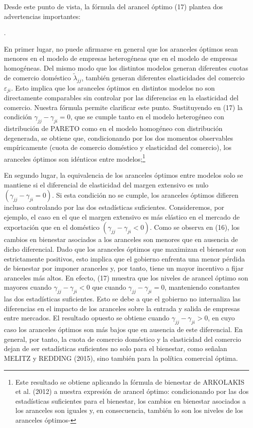 \documentclass[10pt,a4paper]{article}
\newcounter{numitem}
\newenvironment{lnum}
      {\begin{list}{\arabic{numitem}.}{%
          \usecounter{numitem}%
          \setlength{\leftmargin}{1cm}%
          \setlength{\parskip}{3pt}%
          \setlength{\itemsep}{0pt}%
          \setlength{\parsep}{0pt}%
      }}
      {\end{list}}
\begin{document}
Desde este punto de vista, la fórmula del arancel óptimo (17) plantea dos advertencias importantes:
\begin{lnum}
    \item En primer lugar, no puede afirmarse en general que los aranceles óptimos sean menores en el modelo de empresas heterogéneas que en el modelo de empresas homogéneas. Del mismo modo que los distintos modelos generan diferentes cuotas de comercio doméstico $\tilde{\lambda}_{jj}$, también generan diferentes elasticidades del comercio $\varepsilon_{ji}$. Esto implica que los aranceles óptimos en distintos modelos no son directamente comparables sin controlar por las diferencias en la elasticidad del comercio. Nuestra fórmula permite clarificar este punto. Sustituyendo en (17) la condición $\gamma_{jj} - \gamma_{ji} = 0$, que se cumple tanto en el modelo heterogéneo con distribución de PARETO como en el modelo homogéneo con distribución degenerada, se obtiene que, condicionando por los dos momentos observables empíricamente (cuota de comercio doméstico y elasticidad del comercio), los aranceles óptimos son idénticos entre modelos;\footnote{%
        Este resultado se obtiene aplicando la fórmula de bienestar de ARKOLAKIS et al. (2012) a nuestra expresión de arancel óptimo: condicionando por las dos estadísticas suficientes para el bienestar, los cambios en bienestar asociados a los aranceles son iguales y, en consecuencia, también lo son los niveles de los aranceles óptimos-
    }
    \item En segundo lugar, la equivalencia de los aranceles óptimos entre modelos solo se mantiene si el diferencial de elasticidad del margen extensivo es nulo $(\gamma_{jj} - \gamma_{ji} = 0)$. Si esta condición no se cumple, los aranceles óptimos difieren incluso controlando por las dos estadísticas suficientes. Consideremos, por ejemplo, el caso en el que el margen extensivo es más elástico en el mercado de exportación que en el doméstico $(\gamma_{jj} - \gamma_{ji} < 0)$. Como se observa en (16), los cambios en bienestar asociados a los aranceles son menores que en ausencia de dicho diferencial. Dado que los aranceles óptimos que maximizan el bienestar son estrictamente positivos, esto implica que el gobierno enfrenta una menor pérdida de bienestar por imponer aranceles y, por tanto, tiene un mayor incentivo a fijar aranceles más altos. En efecto, (17) muestra que los niveles de arancel óptimo son mayores cuando $\gamma_{jj} - \gamma_{ji} < 0$ que cuando $\gamma_{jj} - \gamma_{ji} = 0$, manteniendo constantes las dos estadísticas suficientes. Esto se debe a que el gobierno no internaliza las diferencias en el impacto de los aranceles sobre la entrada y salida de empresas entre mercados. El resultado opuesto se obtiene cuando $\gamma_{jj} - \gamma_{ji} > 0$, en cuyo caso los aranceles óptimos son más bajos que en ausencia de este diferencial. En general, por tanto, la cuota de comercio doméstico y la elasticidad del comercio dejan de ser estadísticas suficientes no solo para el bienestar, como señalan MELITZ y REDDING (2015), sino también para la política comercial óptima.
\end{lnum}
\end{document}

